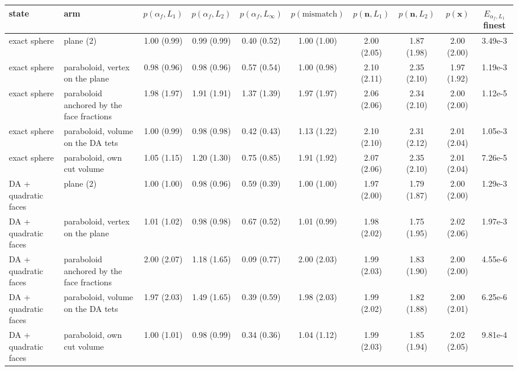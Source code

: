 \begin{tabular}{llcccccccc}
\toprule
state & arm & $p(\alpha_f, L_1)$ & $p(\alpha_f, L_2)$ & $p(\alpha_f, L_\infty)$ & $p(\text{mismatch})$ & $p(\mathbf{n}, L_1)$ & $p(\mathbf{n}, L_2)$ & $p(\mathbf{x})$ & $E_{\alpha_f, L_1}$ finest \\
\midrule
exact sphere & plane (2) & 1.00 (0.99) & 0.99 (0.99) & 0.40 (0.52) & 1.00 (1.00) & 2.00 (2.05) & 1.87 (1.98) & 2.00 (2.00) & 3.49e-3 \\
exact sphere & paraboloid, vertex on the plane & 0.98 (0.96) & 0.98 (0.96) & 0.57 (0.54) & 1.00 (0.98) & 2.10 (2.11) & 2.35 (2.10) & 1.97 (1.92) & 1.19e-3 \\
exact sphere & paraboloid anchored by the face fractions & 1.98 (1.97) & 1.91 (1.91) & 1.37 (1.39) & 1.97 (1.97) & 2.06 (2.06) & 2.34 (2.10) & 2.00 (2.00) & 1.12e-5 \\
exact sphere & paraboloid, volume on the DA tets & 1.00 (0.99) & 0.98 (0.98) & 0.42 (0.43) & 1.13 (1.22) & 2.10 (2.10) & 2.31 (2.12) & 2.01 (2.04) & 1.05e-3 \\
exact sphere & paraboloid, own cut volume & 1.05 (1.15) & 1.20 (1.30) & 0.75 (0.85) & 1.91 (1.92) & 2.07 (2.06) & 2.35 (2.10) & 2.01 (2.04) & 7.26e-5 \\
DA + quadratic faces & plane (2) & 1.00 (1.00) & 0.98 (0.96) & 0.59 (0.39) & 1.00 (1.00) & 1.97 (2.00) & 1.79 (1.87) & 2.00 (2.00) & 1.29e-3 \\
DA + quadratic faces & paraboloid, vertex on the plane & 1.01 (1.02) & 0.98 (0.98) & 0.67 (0.52) & 1.01 (0.99) & 1.98 (2.02) & 1.75 (1.95) & 2.02 (2.06) & 1.97e-3 \\
DA + quadratic faces & paraboloid anchored by the face fractions & 2.00 (2.07) & 1.18 (1.65) & 0.09 (0.77) & 2.00 (2.03) & 1.99 (2.03) & 1.83 (1.90) & 2.00 (2.00) & 4.55e-6 \\
DA + quadratic faces & paraboloid, volume on the DA tets & 1.97 (2.03) & 1.49 (1.65) & 0.39 (0.59) & 1.98 (2.03) & 1.99 (2.02) & 1.82 (1.88) & 2.00 (2.01) & 6.25e-6 \\
DA + quadratic faces & paraboloid, own cut volume & 1.00 (1.01) & 0.98 (0.99) & 0.34 (0.36) & 1.04 (1.12) & 1.99 (2.03) & 1.85 (1.94) & 2.02 (2.05) & 9.81e-4 \\
\bottomrule
\end{tabular}
